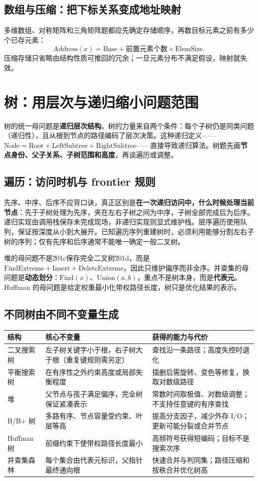\documentclass[11pt,a4paper,openany]{ctexbook}
\newcommand{\key}[1]{\textbf{\color{deep}#1}}
\begin{document}
\subsection{数组与压缩：把下标关系变成地址映射}
多维数组、对称矩阵和三角矩阵题都应先确定存储顺序，再数目标元素之前有多少个已存元素：
\[
\boxed{\text{Address}(x)=\text{Base}+\text{前置元素个数}\times\text{ElemSize}}.
\]
压缩存储只省略由结构性质可推回的冗余；一旦元素分布不满足假设，映射就失效。

\section{树：用层次与递归缩小问题范围}
树的统一母问题是\key{递归层次结构}。树的力量来自两个条件：每个子树仍是同类问题（递归性），且从根到节点的路径编码了层次决策。这种递归定义——$\text{Node}=\text{Root}+\text{LeftSubtree}+\text{RightSubtree}$——直接导致递归算法。树题先画\key{节点身份、父子关系、子树范围和高度}，再谈遍历或调整。

\subsection{遍历：访问时机与 frontier 规则}
先序、中序、后序不应背口诀，真正区别是\key{在一次递归访问中，什么时候处理当前节点}：先于子树处理为先序，夹在左右子树之间为中序，子树全部完成后为后序。递归实现由调用栈保存未完成现场，非递归实现则显式维护栈。层序遍历使用队列，保证按深度从小到大展开。已知遍历序列重建树时，必须利用能够分割左右子树的序列；仅有先序和后序通常不能唯一确定一般二叉树。

堆的母问题不是\u201c保存完全二叉树\u201d，而是 $\text{FindExtreme}+\text{Insert}+\text{DeleteExtreme}$，因此只维护偏序而非全序。并查集的母问题是\key{动态划分}：$\text{Find}(x)$、$\text{Union}(a,b)$，重点不是树本身，而是\key{代表元}。Huffman 的母问题是给定权重最小化带权路径长度，树只是优化结果的表示。

\subsection{不同树由不同不变量生成}
\begin{longtable}{p{2.4cm}p{5.0cm}p{\dimexpr\linewidth-8.67cm\relax}}
\toprule
\textbf{结构} & \textbf{核心不变量} & \textbf{获得的能力与代价}\\
\midrule
二叉搜索树 & 左子树关键字小于根，右子树大于根（重复键规则需另定） & 查找沿一条路径；高度失控时退化\\
\midrule
平衡搜索树 & 在有序性之外约束高度或局部失衡程度 & 插删后需旋转、变色等修复，换取对数级路径\\
\midrule
堆 & 父节点与孩子满足偏序，完全树保证紧凑表示 & 常数时间取极值、对数级调整；不支持任意键的有序查找\\
\midrule
B/B+ 树 & 多路有序、节点容量受约束、叶层等高 & 提高分支因子，减少外存 I/O；更新可能分裂或合并节点\\
\midrule
Huffman 树 & 前缀约束下使带权路径长度最小 & 高频符号获得短编码；目标不是搜索次序\\
\midrule
并查集森林 & 每个集合由代表元标识，父指针最终通向根 & 快速合并与判同集；路径压缩和按秩合并优化树高\\
\bottomrule
\end{longtable}
\end{document}
